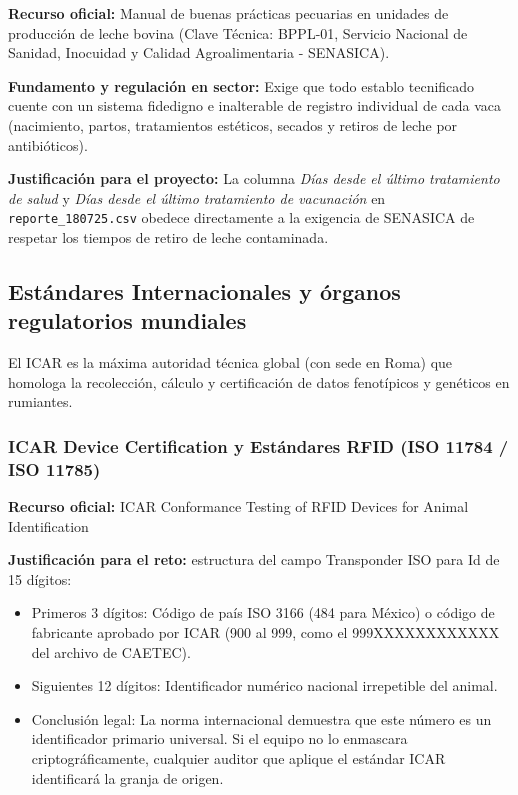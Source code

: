 \textbf{Recurso oficial:} Manual de buenas prácticas pecuarias en unidades de producción de leche bovina (Clave Técnica: BPPL-01, Servicio Nacional de Sanidad, Inocuidad y Calidad Agroalimentaria - SENASICA).

\textbf{Fundamento y regulación en sector:} Exige que todo establo tecnificado cuente con un sistema fidedigno e inalterable de registro individual de cada vaca (nacimiento, partos, tratamientos estéticos, secados y retiros de leche por antibióticos).

\textbf{Justificación para el proyecto:} La columna \emph{Días desde el último tratamiento de salud} y \emph{Días desde el último tratamiento de vacunación} en \texttt{reporte\_180725.csv} obedece directamente a la exigencia de SENASICA de respetar los tiempos de retiro de leche contaminada.

\subsection{Estándares Internacionales y órganos regulatorios mundiales}

El ICAR es la máxima autoridad técnica global (con sede en Roma) que homologa la recolección, cálculo y certificación de datos fenotípicos y genéticos en rumiantes.

\subsubsection{ICAR Device Certification y Estándares RFID (ISO 11784 / ISO 11785)}

\textbf{Recurso oficial:} ICAR Conformance Testing of RFID Devices for Animal Identification

\textbf{Justificación para el reto:} estructura del campo Transponder ISO para Id de 15 dígitos:

\begin{itemize}
  \item Primeros 3 dígitos: Código de país ISO 3166 (484 para México) o código de fabricante aprobado por ICAR (900 al 999, como el 999XXXXXXXXXXXX del archivo de CAETEC).
  \item Siguientes 12 dígitos: Identificador numérico nacional irrepetible del animal.
  \item Conclusión legal: La norma internacional demuestra que este número es un identificador primario universal. Si el equipo no lo enmascara criptográficamente, cualquier auditor que aplique el estándar ICAR identificará la granja de origen.
\end{itemize}

